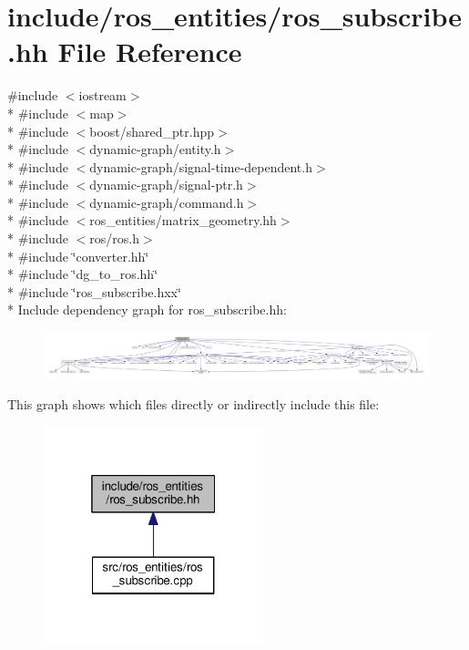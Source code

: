 \hypertarget{ros__subscribe_8hh}{}\section{include/ros\+\_\+entities/ros\+\_\+subscribe.hh File Reference}
\label{ros__subscribe_8hh}
{\ttfamily \#include $<$iostream$>$}\\*
{\ttfamily \#include $<$map$>$}\\*
{\ttfamily \#include $<$boost/shared\+\_\+ptr.\+hpp$>$}\\*
{\ttfamily \#include $<$dynamic-\/graph/entity.\+h$>$}\\*
{\ttfamily \#include $<$dynamic-\/graph/signal-\/time-\/dependent.\+h$>$}\\*
{\ttfamily \#include $<$dynamic-\/graph/signal-\/ptr.\+h$>$}\\*
{\ttfamily \#include $<$dynamic-\/graph/command.\+h$>$}\\*
{\ttfamily \#include $<$ros\+\_\+entities/matrix\+\_\+geometry.\+hh$>$}\\*
{\ttfamily \#include $<$ros/ros.\+h$>$}\\*
{\ttfamily \#include \char`\"{}converter.\+hh\char`\"{}}\\*
{\ttfamily \#include \char`\"{}dg\+\_\+to\+\_\+ros.\+hh\char`\"{}}\\*
{\ttfamily \#include \char`\"{}ros\+\_\+subscribe.\+hxx\char`\"{}}\\*
Include dependency graph for ros\+\_\+subscribe.\+hh\+:
\nopagebreak
\begin{figure}[H]
\begin{center}
\leavevmode
\includegraphics[width=350pt]{ros__subscribe_8hh__incl}
\end{center}
\end{figure}
This graph shows which files directly or indirectly include this file\+:
\nopagebreak
\begin{figure}[H]
\begin{center}
\leavevmode
\includegraphics[width=181pt]{ros__subscribe_8hh__dep__incl}
\end{center}
\end{figure}
